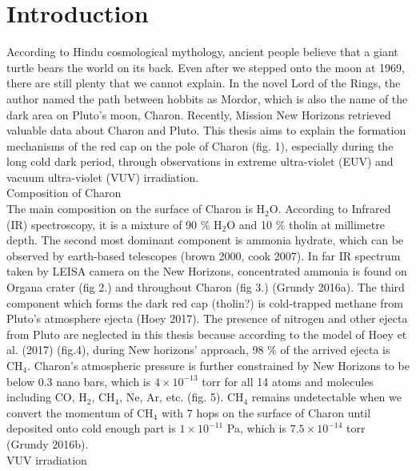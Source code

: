 \chapter{Introduction}
\label{introduction}

According to Hindu cosmological mythology, ancient people believe that a giant turtle bears the world on its back. Even after we stepped onto the moon at 1969, there are still plenty that we cannot explain. In the novel Lord of the Rings, the author named the path between hobbits as Mordor, which is also the name of the dark area on Pluto’s moon, Charon. Recently, Mission New Horizons retrieved valuable data about Charon and Pluto. This thesis aims to explain the formation mechanisms of the red cap on the pole of Charon (fig. 1), especially during the long cold dark period, through observations in extreme ultra-violet (EUV) and vacuum ultra-violet (VUV) irradiation.\\
Composition of Charon\\
The main composition on the surface of Charon is H$_2$O. According to Infrared (IR) spectroscopy, it is a mixture of 90 \% H$_2$O and 10 \% tholin at millimetre depth. The second most dominant component is ammonia hydrate, which can be observed by earth-based telescopes (brown 2000, cook 2007). In far IR spectrum taken by LEISA camera on the New Horizons, concentrated ammonia is found on Organa crater (fig 2.) and throughout Charon (fig 3.) (Grundy 2016a). The third component which forms the dark red cap (tholin?) is cold-trapped methane from Pluto’s atmosphere ejecta (Hoey 2017). The presence of nitrogen and other ejecta from Pluto are neglected in this thesis because according to the model of Hoey et al. (2017) (fig.4), during New horizons’ approach, 98 \% of the arrived ejecta is CH$_4$. Charon’s atmospheric pressure is further constrained by New Horizons to be below 0.3 nano bars, which is $4 \times 10^{-13}$ torr for all 14 atoms and molecules including CO, H$_2$, CH$_4$, Ne, Ar, etc. (fig. 5). CH$_4$ remains undetectable when we convert the momentum of CH$_4$ with 7 hops on the surface of Charon until deposited onto cold enough part is $1 \times 10^{-11}$ Pa, which is $7.5 \times 10^{-14}$ torr (Grundy 2016b).\\
VUV irradiation\\
